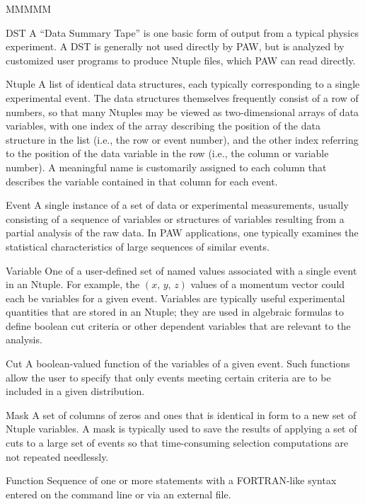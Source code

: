 \begin{DL}{MMMMM}
\item[DST]       A ``Data Summary Tape'' is one basic form of  output from
                 a typical physics experiment.  A DST is generally not used
                 directly by PAW, but is analyzed by customized user programs
                 to produce Ntuple files, which PAW can read directly.
\item[Ntuple]    A list of identical data structures, each typically 
                 corresponding to a single experimental event. The data 
                 structures
                 themselves frequently consist of a row of numbers, so that
                 many Ntuples may be viewed as
                 two-dimensional arrays of data variables, with one
                 index of the array describing the position of the data
                 structure in the list (i.e., the row or event number),
                 and the other index referring to the position of the data
                 variable in the row (i.e., the column or variable number).
                 A meaningful name is customarily assigned to each column
                 that describes the variable contained in that column for each
                 event.  
\item[Event]     A single instance of a set of data  or experimental measurements,
                 usually consisting of a sequence of variables or structures of
                 variables resulting from a partial analysis of the raw data.
                 In PAW applications, one typically examines the statistical
                 characteristics of large sequences of similar events.
\item[Variable]  One of a user-defined set of named values associated with a single
                 event in an Ntuple.
                 For example,
                 the \((x,\,y,\,z)\) values of a momentum vector could each
                 be variables for a given event.  Variables are typically
                 useful experimental quantities that are stored in an
                 Ntuple;  they are used in algebraic formulas
                 to define boolean cut criteria
                 or other dependent variables that are
                 relevant to the analysis.
\item[Cut]       A  boolean-valued function of the variables of a given event.
                 Such functions allow the user to specify that only  events
                 meeting certain criteria are to be included in a given distribution.
\item[Mask]      A set of columns of zeros and ones that is identical in form
                 to a new set of Ntuple variables.  A mask is typically
                 used to save the results of applying a set of cuts to a large
                 set of events so that
                 time-consuming selection computations are not repeated needlessly.
\item[Function]  Sequence of one or more statements with a FORTRAN-like syntax
                 entered on the command line or via an external file.
\end{DL}

